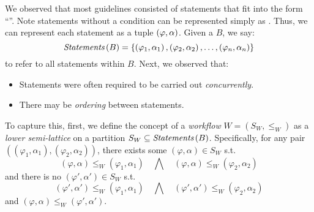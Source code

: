 We observed that most guidelines consisted of statements that fit
into the form ``''. Note
statements without a condition can be represented simply as .
Thus, we can represent each statement as a tuple ${\left(\varphi, \alpha\right)}{}$.
Given a \BPG{} $B$, we say:
\begin{equation}
\textit{Statements}\left(B\right) =
\left\{\left(\varphi_1,\alpha_1\right),\left(\varphi_2,\alpha_2\right),\dots,\left(\varphi_n,\alpha_n\right)\right\}
\end{equation}
to refer to all statements within $B$. Next, we observed that:
\begin{itemize}
  \item Statements were often required to be carried out \emph{concurrently}.
  \item There may be \emph{ordering} between statements.
\end{itemize}
To capture this, first, we define the concept of a \emph{workflow}
$W = \left(S_W, \leq_W\right)$ as a \emph{lower semi-lattice} on a partition $S_W \subseteq \textit{Statements}\left(B\right)$.
Specifically, for any pair $\left(\left(\varphi_1,\alpha_1\right),
\left(\varphi_2, \alpha_2\right)\right)$, there exists some
$\left(\varphi,\alpha\right) \in S_W$ s.t.
\begin{equation}
    \left(\varphi,\alpha\right) \leq_W
    \left(\varphi_1,\alpha_1\right)\quad\bigwedge\quad
    \left(\varphi,\alpha\right) \leq_W \left(\varphi_2,\alpha_2\right)
\end{equation}
\noindent and there is no $\left(\varphi',\alpha'\right) \in S_W$ s.t.
\begin{equation}
    \left(\varphi',\alpha'\right) \leq_W
    \left(\varphi_1,\alpha_1\right)\quad\bigwedge\quad\left(\varphi',\alpha'\right) \leq_W
    \left(\varphi_2,\alpha_2\right)
\end{equation}
\noindent and $\left(\varphi,\alpha\right) \leq_W \left(\varphi',\alpha'\right)$.
